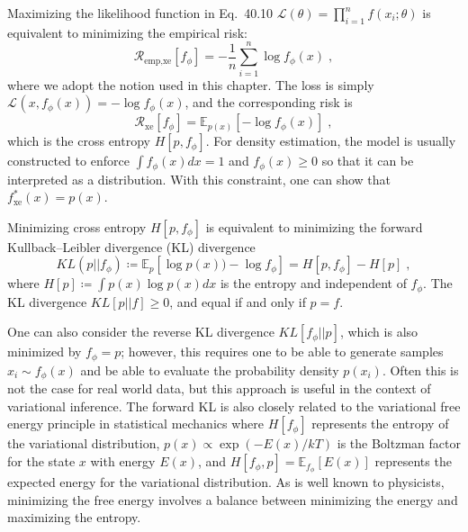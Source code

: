 Maximizing the likelihood function in Eq.~40.10  $\mathcal{L}(\theta) = \prod_{i=1}^n f(x_i; \theta)$ is equivalent to minimizing the empirical risk:
\begin{equation}
    \label{ML:eq:max_likelihood} 
    \mathcal{R}_\textrm{emp,xe}[f_\phi] = - \frac{1}{n} \sum_{i=1}^n \log f_\phi(x) \;,
\end{equation}
where we adopt the notion used in this chapter. The loss is simply $\mathcal{L}_\textrm{}(x,f_\phi(x)) = -\log f_\phi(x)$, and the corresponding risk is 
\begin{equation}
    \label{ML:eq:xe_risk_density} 
    \mathcal{R}_\textrm{xe}[f_\phi] = \mathbb{E}_{p(x)}[- \log f_\phi(x) ] %
    \;,
\end{equation}
which is the cross entropy $H[p, f_\phi]$. For density estimation, the model is usually constructed to enforce $\int f_\phi(x) dx =1$ and $f_\phi(x) \ge 0$ so that it can be interpreted as a distribution. With this constraint, one can show that $f^*_\textrm{xe}(x) = p(x)$. 

Minimizing cross entropy $H[p,f_\phi]$ is equivalent to minimizing the forward Kullback–Leibler divergence (KL) divergence
\begin{equation}
    KL(p||f_\phi)\coloneqq \mathbb{E}_p[ \log p(x))- \log f_\phi] = H[p,f_\phi] - H[p] \; , 
\end{equation}
where $H[p] \coloneqq \int p(x) \log p(x) dx$ is the entropy and independent of $f_\phi$. The KL divergence $KL[p||f] \ge 0$, and equal if and only if $p=f$. 

One can also consider the reverse KL divergence $KL[f_\phi || p]$, which is also minimized by $f_\phi=p$; however, this requires one to be able to generate samples $x_i \sim f_\phi(x)$ and be able to evaluate the probability density $p(x_i)$. Often this is not the case for real world data, but this approach is useful in the context of variational inference. The forward KL is also closely related to the variational free energy principle in statistical mechanics where $H[f_\phi]$ represents the entropy of the variational distribution, $p(x) \propto \exp(-E(x)/kT)$ is the Boltzman factor for the state $x$ with energy $E(x)$, and $H[f_\phi, p] = \mathbb{E}_{f_\phi}[E(x)]$ represents the expected energy for the variational distribution. As is well known to physicists, minimizing the free energy involves a balance between minimizing the energy and maximizing the entropy.



